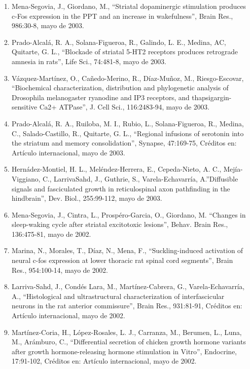 \begin{enumerate}
\item Mena-Segovia, J., Giordano, M., “Striatal dopaminergic stimulation produces c-Fos expression in the PPT and an increase in 
wakefulness”, 
Brain Res., 986:30-8, mayo de 2003.

\item Prado-Alcalá, R. A., Solana-Figueroa, R., Galindo, L. E., Medina, AC, Quitarte, G. L., “Blockade of striatal 5-HT2 receptors produces 
retrograde amnesia in rats”, Life Sci., 74:481-8, mayo de 2003.

\item Vázquez-Martínez, O., Cañedo-Merino, R., Díaz-Muñoz, M., Riesgo-Escovar, “Biochemical characterization, distribution and phylogenetic 
analysis of Drosophila melanogaster ryanodine and IP3 receptors, and thapsigargin-sensitive Ca2+ ATPase”, J. Cell Sci., 116:2483-94, mayo de 
2003.

\item Prado-Alcalá, R. A., Ruiloba, M. I., Rubio, L., Solana-Figueroa, R., Medina, C., Salado-Castillo, R., Quitarte, G. L., “Regional 
infusions of 
serotonin into the striatum and memory consolidation”, Synapse, 47:169-75, Créditos en: Artículo internacional, mayo de 2003.

\item Hernádez-Montiel, H. L., Meléndez-Herrera, E., Cepeda-Nieto, A. C., Mejía-Viggiano, C., LarrivaSahd, J., Guthrie, S., 
Varela-Echavarría, 
A.”Diffusible signals and fasciculated growth in reticulospinal axon pathfinding in the hindbrain”, Dev. Biol., 255:99-112, mayo de 2003.

\item Mena-Segovia, J., Cintra, L., Prospéro-Garcia, O., Giordano, M. “Changes in sleep-waking cycle after striatal excitotoxic lesions”, 
Behav. 
Brain Res., 136:475-81, mayo de 2002.

\item Marina, N., Morales, T., Díaz, N., Mena, F., “Suckling-induced activation of neural c-fos expression at lower thoracic rat spinal cord 
segments”, Brain Res., 954:100-14, mayo de 2002.

\item Larriva-Sahd, J., Condés Lara, M., Martínez-Cabrera, G., Varela-Echavarría, A., “Histological and ultrastructural characterization of 
interfascicular neurons in the rat anterior commissure”, Brain Res., 931:81-91, Créditos en: Artículo internacional, mayo de 2002.

\item Martínez-Coria, H., López-Rosales, L. J., Carranza, M., Berumen, L., Luna, M., Arámburo, C., “Differential secretion of chicken growth 
hormone variants after growth hormone-releasing hormone stimulation in Vitro”, Endocrine, 17:91-102, Créditos en: Artículo internacional, 
mayo de 2002.


\end{enumerate}
